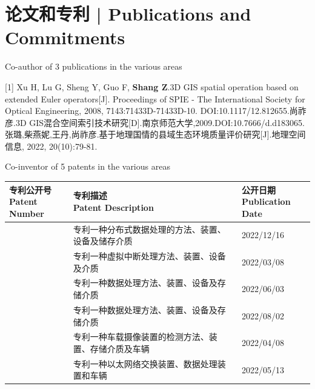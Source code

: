 \documentclass{resume}
\begin{document}
\section{论文和专利 | Publications and Commitments}

Co-author of 3 publications in the various areas

[1] Xu H, Lu G, Sheng Y, Guo F, \textbf{Shang Z}.3D GIS spatial operation based on extended Euler operators[J].\newline
  Proceedings of SPIE - The International Society for Optical Engineering, 2008, 7143:71433D-71433D-10.\newline
  DOI:10.1117/12.812655.\newline
[2]尚祚彦.3D GIS混合空间索引技术研究[D].南京师范大学,2009.DOI:10.7666/d.d183065.\newline
[3]张璐,柴燕妮,王丹,尚祚彦.基于地理国情的县域生态环境质量评价研究[J].地理空间信息, 2022, 20(10):79-81.

Co-inventor of 5 patents in the various areas

\begin{tabularx}{\textwidth}{|p{7.2em}|X|p{6.8em}|}
\hline
\makecell[lt]{专利公开号\\Patent Number} & \makecell[lt]{专利描述\\Patent Description} & \makecell[lt]{公开日期\\Publication Date}\\
\hline
[CN115480934A] & 专利一种分布式数据处理的方法、装置、设备及储存介质 & 2022/12/16\\
\hline
[CN114153560A] & 专利一种虚拟中断处理方法、装置、设备及介质 & 2022/03/08\\
\hline
[CN114579556A] & 专利一种数据处理方法、装置、设备及存储介质 & 2022/06/03\\
\hline
[CN114579556B] & 专利一种数据处理方法、装置、设备及存储介质 & 2022/08/02\\
\hline
[CN114298990A] & 专利一种车载摄像装置的检测方法、装置、存储介质及车辆 & 2022/04/08\\
\hline
[CN114500408A] & 专利一种以太网络交换装置、数据处理装置和车辆 & 2022/05/13\\
\hline
\end{tabularx}




  
  


%
%
\end{document}
